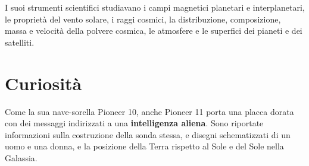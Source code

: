 \documentclass[12pt,a4paper]{article}
\begin{document}
I suoi strumenti scientifici studiavano i campi magnetici planetari e interplanetari, le proprietà del vento solare, i raggi cosmici, la distribuzione, composizione, massa e velocità della polvere cosmica, le atmosfere e le superfici dei pianeti e dei satelliti.

\section*{Curiosità}
\label{curiosit}

Come la sua nave-sorella Pioneer 10, anche Pioneer 11 porta una placca dorata con dei messaggi indirizzati a una \textbf{intelligenza aliena}. Sono riportate informazioni sulla costruzione della sonda stessa, e disegni schematizzati di un uomo e una donna, e la posizione della Terra rispetto al Sole e del Sole nella Galassia.
\end{document}
